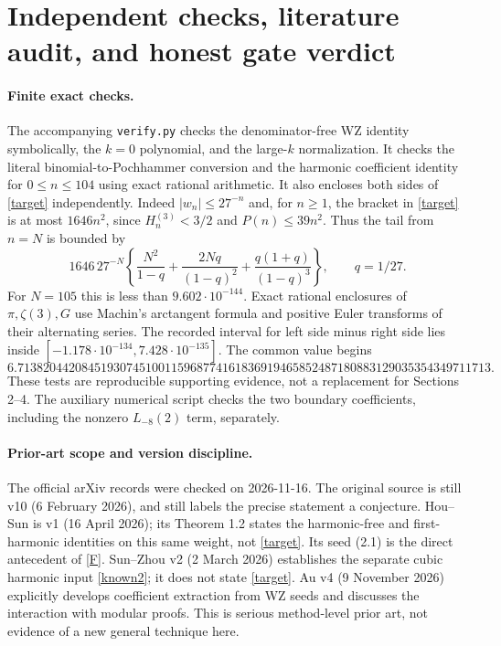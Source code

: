 \documentclass[11pt,a4paper]{article}
\newcommand{\Li}{L_{-8}(2)}\newcommand{\hh}{H^{(3)}}
\begin{document}
\section{Independent checks, literature audit, and honest gate verdict}
\paragraph{Finite exact checks.}
The accompanying \texttt{verify.py} checks the denominator-free WZ
identity symbolically, the $k=0$ polynomial, and the large-$k$ normalization.
It checks the literal binomial-to-Pochhammer conversion and the harmonic
coefficient identity for $0\le n\le104$ using exact rational arithmetic.
It also encloses both sides of \eqref{target} independently. Indeed
$|w_n|\le27^{-n}$ and, for $n\ge1$, the bracket in \eqref{target} is at most
$1646n^2$, since $H_n^{(3)}<3/2$ and $P(n)\le39n^2$.
Thus the tail from $n=N$ is bounded by
\[
 1646\,27^{-N}\left\{\frac{N^2}{1-q}
 +\frac{2Nq}{(1-q)^2}+\frac{q(1+q)}{(1-q)^3}\right\},\qquad q=1/27.
\]
For $N=105$ this is less than $9.602\cdot10^{-144}$.
Exact rational enclosures of $\pi,\zeta(3),G$ use Machin's arctangent
formula and positive Euler transforms of their alternating series.
The recorded interval for left side minus right side lies inside
$[-1.178\cdot10^{-134},7.428\cdot10^{-135}]$.
The common value begins
\[
 6.71382044208451930745100115968774161836919465852487180883129035354349711713.
\]
These tests are reproducible supporting evidence, not a replacement for
Sections 2--4. The auxiliary numerical script checks the two boundary
coefficients, including the nonzero $\Li$ term, separately.

\paragraph{Prior-art scope and version discipline.}
The official arXiv records were checked on 2026-11-16. The original source
is still v10 (6 February 2026), and still labels the precise statement a
conjecture. Hou--Sun is v1 (16 April 2026); its Theorem 1.2 states the
harmonic-free and first-harmonic identities on this same weight, not
\eqref{target}. Its seed (2.1) is the direct antecedent of \eqref{F}.
Sun--Zhou v2 (2 March 2026) establishes the separate cubic harmonic input
\eqref{known2}; it does not state \eqref{target}. Au v4
(9 November 2026) explicitly develops coefficient extraction from WZ
seeds and discusses the interaction with modular proofs. This is serious
method-level prior art, not evidence of a new general technique here.
\end{document}
